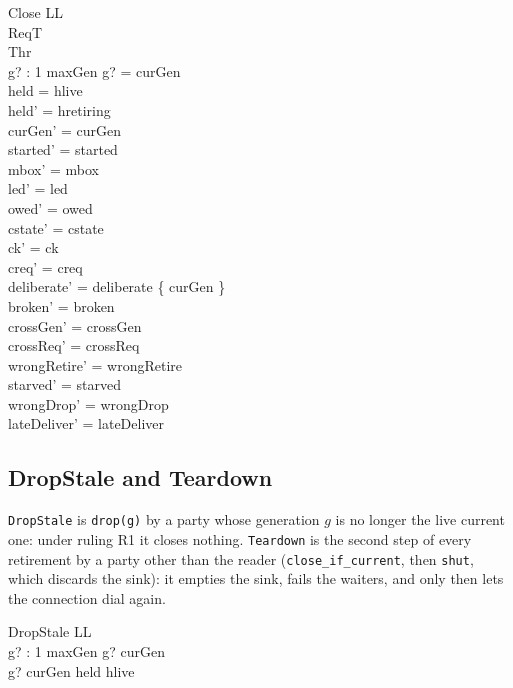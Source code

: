 \documentclass[a4paper,10pt,fleqn]{article}
\begin{document}
\begin{schema}{Close}
  \Delta LL \\
  \Xi ReqT \\
  \Xi Thr \\
  g? : 1 \upto maxGen
\where
  g? = curGen \\
  held = hlive \\
  held' = hretiring \\
  curGen' = curGen \\
  started' = started \\
  mbox' = mbox \\
  led' = led \\
  owed' = owed \\
  cstate' = cstate \\
  ck' = ck \\
  creq' = creq \\
  deliberate' = deliberate \cup \{ curGen \} \\
  broken' = broken \\
  crossGen' = crossGen \\
  crossReq' = crossReq \\
  wrongRetire' = wrongRetire \\
  starved' = starved \\
  wrongDrop' = wrongDrop \\
  lateDeliver' = lateDeliver
\end{schema}

\subsection{DropStale and Teardown}

\texttt{DropStale} is \texttt{drop(g)} by a party whose generation $g$ is no
longer the live current one: under ruling R1 it closes nothing.
\texttt{Teardown} is the second step of every retirement by a party other than
the reader (\texttt{close\_if\_current}, then \texttt{shut}, which discards the
sink): it empties the sink, fails the waiters, and only then lets the connection
dial again.

\begin{schema}{DropStale}
  \Xi LL \\
  g? : 1 \upto maxGen
\where
  g? \leq curGen \\
  g? \neq curGen \lor held \neq hlive
\end{schema}
\end{document}
